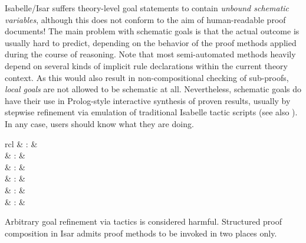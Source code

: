 \begin{isabellebody}
\begin{isamarkuptext}
  \begin{warn}
    Isabelle/Isar suffers theory-level goal statements to contain
    \emph{unbound schematic variables}, although this does not conform
    to the aim of human-readable proof documents!  The main problem
    with schematic goals is that the actual outcome is usually hard to
    predict, depending on the behavior of the proof methods applied
    during the course of reasoning.  Note that most semi-automated
    methods heavily depend on several kinds of implicit rule
    declarations within the current theory context.  As this would
    also result in non-compositional checking of sub-proofs,
    \emph{local goals} are not allowed to be schematic at all.
    Nevertheless, schematic goals do have their use in Prolog-style
    interactive synthesis of proven results, usually by stepwise
    refinement via emulation of traditional Isabelle tactic scripts
    (see also ).  In any case, users
    should know what they are doing.
  \end{warn}%
\end{isamarkuptext}%
\isamarkuptrue%
%
\isamarkuptrue%
%
\begin{isamarkuptext}%
\begin{matharray}{rcl}
     & : &  \\
     & : &  \\
     & : &  \\
    \isa{\isacommand{{\isachardot}{\isachardot}}} & : &  \\
    \isa{\isacommand{{\isachardot}}} & : &  \\
     & : &  \\
  \end{matharray}

  Arbitrary goal refinement via tactics is considered harmful.
  Structured proof composition in Isar admits proof methods to be
  invoked in two places only.


\end{isamarkuptext}
\end{isabellebody}
